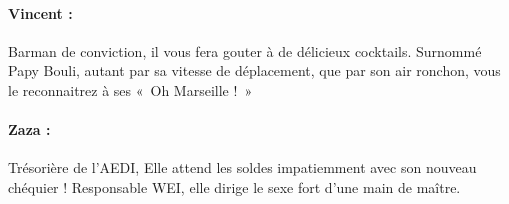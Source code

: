 \paragraph{Vincent :} Barman de conviction, il vous fera gouter à de délicieux cocktails. Surnommé Papy Bouli, autant par sa vitesse de déplacement, que par son air ronchon, vous le reconnaitrez à ses «~Oh Marseille !~»
\paragraph{Zaza :} Trésorière de l'AEDI, Elle attend les soldes impatiemment avec son nouveau chéquier ! Responsable WEI, elle dirige le sexe fort d'une main de maître.
